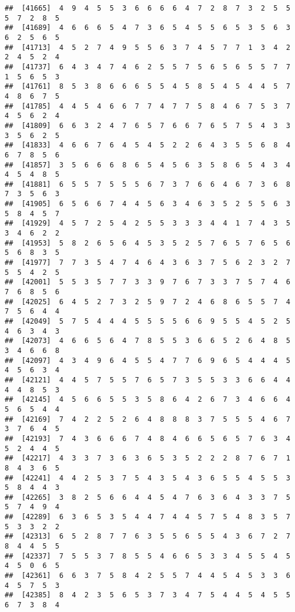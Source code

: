 \documentclass[
]{book}
\begin{document}
\begin{verbatim}
##  [41665]  4  9  4  5  5  3  6  6  6  6  4  7  2  8  7  3  2  5  5  5  7  2  8  5
##  [41689]  4  6  6  6  5  4  7  3  6  5  4  5  5  6  5  3  5  6  3  6  2  5  6  5
##  [41713]  4  5  2  7  4  9  5  5  6  3  7  4  5  7  7  1  3  4  2  2  4  5  2  4
##  [41737]  6  4  3  4  7  4  6  2  5  5  7  5  6  5  6  5  5  7  7  1  5  6  5  3
##  [41761]  8  5  3  8  6  6  6  5  5  4  5  8  5  4  5  4  4  5  7  4  8  6  7  5
##  [41785]  4  4  5  4  6  6  7  7  4  7  7  5  8  4  6  7  5  3  7  4  5  6  2  4
##  [41809]  6  6  3  2  4  7  6  5  7  6  6  7  6  5  7  5  4  3  3  3  5  6  2  5
##  [41833]  4  6  6  7  6  4  5  4  5  2  2  6  4  3  5  5  6  8  4  6  7  8  5  6
##  [41857]  3  5  6  6  6  8  6  5  4  5  6  3  5  8  6  5  4  3  4  4  5  4  8  5
##  [41881]  6  5  5  7  5  5  5  6  7  3  7  6  6  4  6  7  3  6  8  7  3  5  6  3
##  [41905]  6  5  6  6  7  4  4  5  6  3  4  6  3  5  2  5  5  6  3  5  8  4  5  7
##  [41929]  4  5  7  2  5  4  2  5  5  3  3  3  4  4  1  7  4  3  5  3  4  6  2  2
##  [41953]  5  8  2  6  5  6  4  5  3  5  2  5  7  6  5  7  6  5  6  5  6  8  3  5
##  [41977]  7  7  3  5  4  7  4  6  4  3  6  3  7  5  6  2  3  2  7  5  5  4  2  5
##  [42001]  5  5  3  5  7  7  3  3  9  7  6  7  3  3  7  5  7  4  6  7  6  8  5  6
##  [42025]  6  4  5  2  7  3  2  5  9  7  2  4  6  8  6  5  5  7  4  7  5  6  4  4
##  [42049]  5  7  5  4  4  4  5  5  5  5  6  6  9  5  5  4  5  2  5  4  6  3  4  3
##  [42073]  4  6  6  5  6  4  7  8  5  5  3  6  6  5  2  6  4  8  5  3  4  6  6  8
##  [42097]  4  3  4  9  6  4  5  5  4  7  7  6  9  6  5  4  4  4  5  4  5  6  3  4
##  [42121]  4  4  5  7  5  5  7  6  5  7  3  5  5  3  3  6  6  4  4  4  4  8  5  3
##  [42145]  4  5  6  6  5  5  3  5  8  6  4  2  6  7  3  4  6  6  4  5  6  5  4  4
##  [42169]  7  4  2  2  5  2  6  4  8  8  8  3  7  5  5  5  4  6  7  3  7  6  4  5
##  [42193]  7  4  3  6  6  6  7  4  8  4  6  6  5  6  5  7  6  3  4  5  2  4  4  5
##  [42217]  4  3  3  7  3  6  3  6  5  3  5  2  2  2  8  7  6  7  1  8  4  3  6  5
##  [42241]  4  4  2  5  3  7  5  4  3  5  4  3  6  5  5  4  5  5  3  5  8  4  4  3
##  [42265]  3  8  2  5  6  6  4  4  5  4  7  6  3  6  4  3  3  7  5  5  7  4  9  4
##  [42289]  6  3  6  5  3  5  4  4  7  4  4  5  7  5  4  8  3  5  7  5  3  3  2  2
##  [42313]  6  5  2  8  7  7  6  3  5  5  6  5  5  4  3  6  7  2  7  8  4  4  5  5
##  [42337]  7  5  5  3  7  8  5  5  4  6  6  5  3  3  4  5  5  4  5  4  5  0  6  5
##  [42361]  6  6  3  7  5  8  4  2  5  5  7  4  4  5  4  5  3  3  6  4  5  7  5  3
##  [42385]  8  4  2  3  5  6  5  3  7  3  4  7  5  4  4  5  4  5  5  6  7  3  8  4

\end{verbatim}
\end{document}
